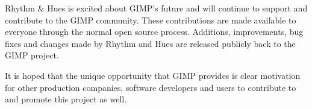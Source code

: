 Rhythm \& Hues is excited about GIMP's future and will continue to support and
contribute to the GIMP community. These contributions are made available to
everyone through the normal open source process. Additions, improvements, bug
fixes and changes made by Rhythm and Hues are released publicly back to the
GIMP project.

It is hoped that the unique opportunity that GIMP provides is clear motivation
for other production companies, software developers and users to contribute to
and promote this project as well.
